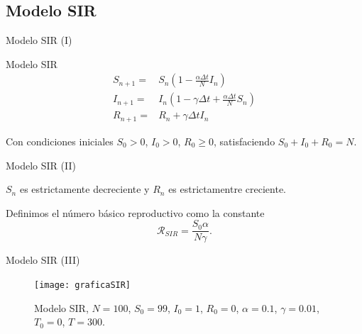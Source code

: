 \subsection{Modelo SIR}


\begin{frame}{Modelo SIR (I)}

    \begin{block}{Modelo SIR \cite{allenDiscretetimeSISIR1994}}
        \begin{equation}
        \label{eqn: SIR_modelo}
        \begin{aligned}
        S_{n+1} = & S_n \left(1-\frac{\alpha\Delta t}{N} I_n \right) \\
        I_{n+1} = & I_n \left( 1-\gamma \Delta t + \frac{\alpha\Delta t}{N} S_n \right) \\
        R_{n+1} = & R_n + \gamma \Delta t I_n
        \end{aligned}
        \end{equation}
        
        Con condiciones iniciales $S_0>0$, $I_0>0$, $R_0\geq 0$, satisfaciendo $S_0+I_0+R_0=N$.
    \end{block}
\end{frame}


\begin{frame}{Modelo SIR (II)}

        \begin{lema}
            $S_n$ es estrictamente decreciente y $R_n$ es estrictamentre creciente.
        \end{lema}

        \pause

        \begin{definition}
            Definimos el número básico reproductivo como la constante 
            $$\mathcal{R}_{SIR}=\frac{S_0 \alpha}{N\gamma }.$$
        \end{definition}

\end{frame}


\begin{frame}{Modelo SIR (III)}
    \begin{figure}
        \begin{center}
        \caption{Modelo SIR, $N=100$, $S_0=99$, $I_0 = 1$, $R_0 = 0$, $\alpha = 0.1$, $\gamma = 0.01$, $T_0 = 0$, $T = 300$.}
        \texttt{[image: graficaSIR]}
        \end{center}
    \end{figure}
\end{frame}


